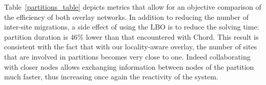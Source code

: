 
Table~\ref{partitions_table} depicts metrics that allow for an objective 
comparison of the efficiency of both overlay networks. In addition to reducing 
the number of inter-site migrations, a side effect of using the LBO is to 
reduce the solving time: partition duration is 46\% lower than that encountered 
with Chord. This result is consistent with the fact that with our locality-aware
overlay, the number of sites that are involved in partitions becomes very close 
to one. Indeed collaborating with closer nodes allows exchanging information between
nodes of the partition much faster, thus increasing once again the reactivity
of the system.

% 
